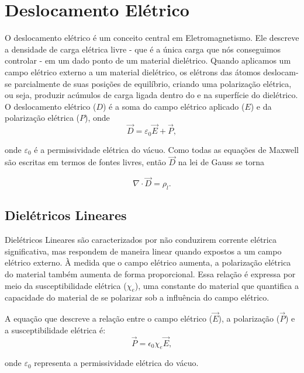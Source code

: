 \newpage\section{ Deslocamento Elétrico}

O deslocamento elétrico é um conceito central em Eletromagnetismo. Ele descreve a densidade de carga elétrica livre  -  que é a única carga que nós conseguimos controlar - em um dado ponto de um material dielétrico. Quando aplicamos um campo elétrico externo a um material dielétrico, os elétrons das átomos deslocam-se parcialmente de suas posições de equilíbrio, criando uma polarização elétrica, ou seja, produzir acúmulos de carga ligada dentro do e na superfície do dielétrico. O deslocamento elétrico ($D$) é a soma do campo elétrico aplicado ($E$) e da polarização elétrica ($P$), onde
\begin{equation}
\vec{D} = \varepsilon_0 \vec{E} + \vec{P},
\end{equation}

onde $\varepsilon_0$ é a permissividade elétrica do vácuo. Como todas as equações de Maxwell são escritas em termos de fontes livres, então $\vec{D}$ na lei de Gauss se torna

\begin{equation}
    \nabla \cdot \vec{D} = \rho_l .
\end{equation}


\subsection{Dielétricos Lineares}

Dielétricos Lineares são caracterizados por não conduzirem corrente elétrica significativa, mas respondem de maneira linear quando expostos a um campo elétrico externo. À medida que o campo elétrico aumenta, a polarização elétrica do material também aumenta de forma proporcional. Essa relação é expressa por meio da susceptibilidade elétrica ($\chi_e$), uma constante do material que quantifica a capacidade do material de se polarizar sob a influência do campo elétrico.

A equação que descreve a relação entre o campo elétrico ($\vec{E}$), a polarização ($\vec{P}$) e a susceptibilidade elétrica é:
\begin{equation}
    \vec{P}=\epsilon_0 \chi_e \vec{E}, 
\end{equation}


onde $\varepsilon_0$ representa a permissividade elétrica do vácuo.

